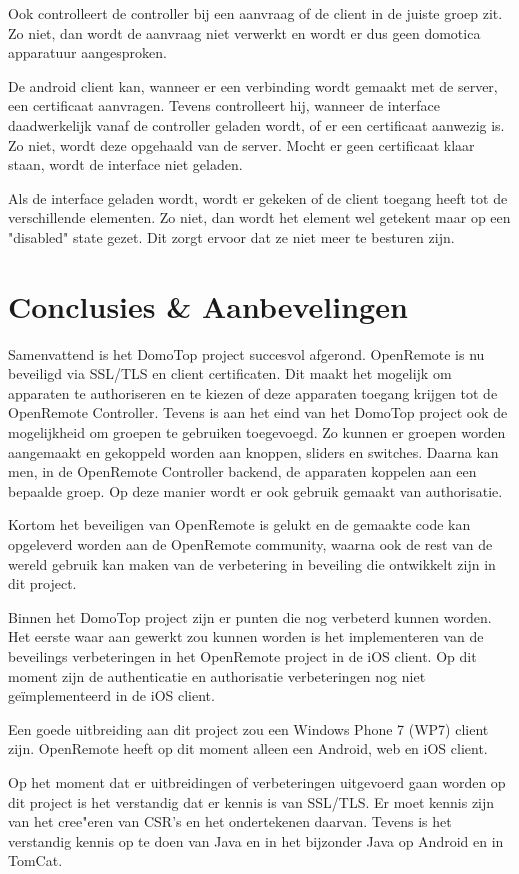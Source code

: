 \documentclass[]{article}
\begin{document}
Ook controlleert de controller bij een aanvraag of de client in de juiste groep
zit. Zo niet, dan wordt de aanvraag niet verwerkt en wordt er dus geen domotica
apparatuur aangesproken. 

De android client kan, wanneer er een verbinding wordt gemaakt met de server,
een certificaat aanvragen. Tevens controlleert hij, wanneer de interface
daadwerkelijk vanaf de controller geladen wordt, of er een certificaat aanwezig
is. Zo niet, wordt deze opgehaald van de server. Mocht er geen certificaat klaar
staan, wordt de interface niet geladen. 

Als de interface geladen wordt, wordt er gekeken of de client toegang heeft tot
de verschillende elementen. Zo niet, dan wordt het element wel getekent maar op
een "disabled" state gezet. Dit zorgt ervoor dat ze niet meer te besturen zijn.


\newpage
\section{Conclusies \& Aanbevelingen}
Samenvattend is het DomoTop project succesvol afgerond. OpenRemote is nu beveiligd
via SSL/TLS en client certificaten. Dit maakt het mogelijk om apparaten te
authoriseren en te kiezen of deze apparaten toegang krijgen tot de
OpenRemote Controller. Tevens is aan het eind van het DomoTop project ook de
mogelijkheid om groepen te gebruiken toegevoegd. Zo kunnen er groepen worden aangemaakt en
gekoppeld worden aan knoppen, sliders en switches. Daarna kan men, in de OpenRemote
Controller backend, de apparaten koppelen aan een bepaalde groep. Op deze
manier wordt er ook gebruik gemaakt van authorisatie.

Kortom het beveiligen van OpenRemote is gelukt en de gemaakte code kan
opgeleverd worden aan de OpenRemote community, waarna ook de rest van de wereld
gebruik kan maken van de verbetering in beveiling die ontwikkelt zijn in dit
project. 

Binnen het DomoTop project zijn er punten die nog verbeterd kunnen worden. Het eerste waar
aan gewerkt zou kunnen worden is het implementeren van de beveilings
verbeteringen in het OpenRemote project in de iOS client. Op dit moment zijn de
authenticatie en authorisatie verbeteringen nog niet ge\"implementeerd in de iOS
client.

Een goede uitbreiding aan dit project zou een Windows Phone 7 (WP7) client zijn.
OpenRemote heeft op dit moment alleen een Android, web en iOS client. 

Op het moment dat er uitbreidingen of verbeteringen uitgevoerd gaan worden op
dit project is het verstandig dat er kennis is van SSL/TLS. Er moet kennis zijn
van het cree"eren van CSR's en het ondertekenen daarvan. Tevens is het
verstandig kennis op te doen van Java en in het bijzonder Java op Android en in
TomCat.
\end{document}
